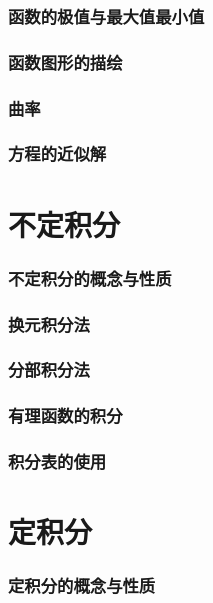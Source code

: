 \documentclass{article}
\begin{document}
  \section{函数的极值与最大值最小值}
    
  \section{函数图形的描绘}
    
  \section{曲率}
    
  \section{方程的近似解}
    

  \newpage
  \part{不定积分}
  \section{不定积分的概念与性质}
    
  \section{换元积分法}
    
  \section{分部积分法}
    
  \section{有理函数的积分}
    
  \section{积分表的使用}
    

  \newpage
  \part{定积分}
  \section{定积分的概念与性质}
    
\end{document}
